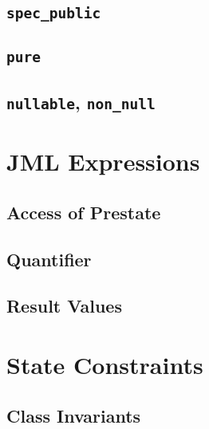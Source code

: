 \documentclass[a4paper, 11pt, accentcolor = tud3b]{tudreport}
\begin{document}
            \subsection{\texttt{spec\_public}} %

            \subsection{\texttt{pure}} %

            \subsection{\texttt{nullable}, \texttt{non\_null}} %

        \section{JML Expressions} %

            \subsection{Access of Prestate} %

            \subsection{Quantifier} %

            \subsection{Result Values} %

        \section{State Constraints} %

            \subsection{Class Invariants} %
\end{document}
